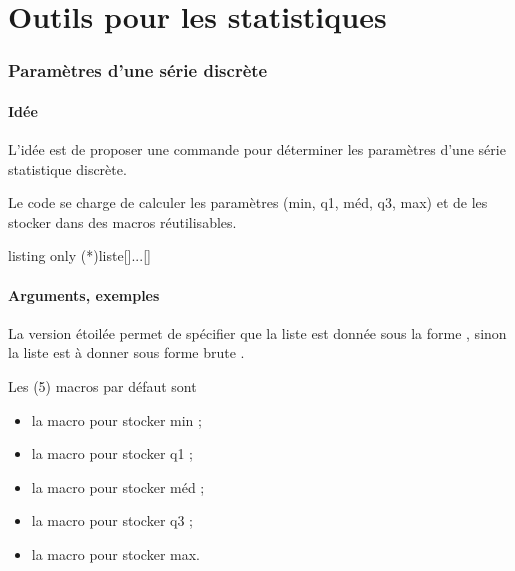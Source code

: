 \part{Outils pour les statistiques}

\section{Paramètres d'une série discrète}\label{paramstats}

\subsection{Idée}

\begin{tipblock}
 L'idée est de proposer une commande pour déterminer les paramètres d'une série statistique discrète.

Le code se charge de calculer les paramètres (min, q1, méd, q3, max) et de les stocker dans des macros réutilisables.
\end{tipblock}

\begin{PresCodeTexPL}{listing only}
\DeterminerParamStats(*){liste}[\macromin]...[\macromax]
\end{PresCodeTexPL}

\subsection{Arguments, exemples}

\begin{cautionblock}
La version étoilée permet de spécifier que la liste est donnée sous la forme , sinon la liste est à donner sous forme brute .

\smallskip

Les (5) macros par défaut sont 

\begin{itemize}
	\item la macro  pour stocker min ;
	\item la macro  pour stocker q1 ;
	\item la macro  pour stocker méd ;
	\item la macro  pour stocker q3 ;
	\item la macro  pour stocker max.
\end{itemize}
\vspace*{-\baselineskip}\leavevmode
\end{cautionblock}

